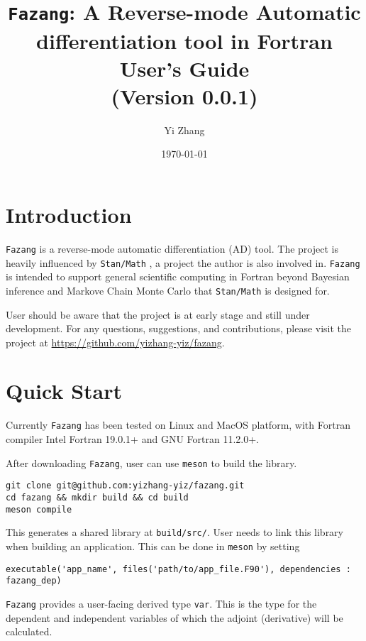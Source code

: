 \documentclass[12pt, reqno, oneside]{amsbook}
\author{Yi Zhang}
\date{\today}
\title{\texttt{Fazang}: A Reverse-mode Automatic differentiation tool in Fortran\\\medskip
\large User's Guide \\  (Version 0.0.1)}
\begin{document}
\maketitle
\tableofcontents


\chapter{Introduction}
\label{sec:orgb2d5569}
\texttt{Fazang} is a reverse-mode automatic differentiation (AD) tool. The
project is heavily influenced by \texttt{Stan/Math} \cite{Carpenter:2015}, a project the author
is also involved in. \texttt{Fazang} is intended to support general scientific
computing in Fortran beyond Bayesian inference and Markove Chain
Monte Carlo that \texttt{Stan/Math} is designed for. 

User should be aware that the project is at early stage and still
under development. For any questions, suggestions, and
contributions, please visit the project at \url{https://github.com/yizhang-yiz/fazang}.
\chapter{Quick Start}
\label{sec:orgf3c265c}
Currently \texttt{Fazang} has been tested on Linux and MacOS platform, with
Fortran compiler Intel Fortran 19.0.1+ and GNU Fortran 11.2.0+.

After downloading \texttt{Fazang}, user can use \texttt{meson} to build the library.
\begin{verbatim}
git clone git@github.com:yizhang-yiz/fazang.git
cd fazang && mkdir build && cd build
meson compile
\end{verbatim}
This generates a shared library at \texttt{build/src/}. User needs to link
this library when building an application. This can be done in
\texttt{meson} by setting
\begin{verbatim}
executable('app_name', files('path/to/app_file.F90'), dependencies : fazang_dep)
\end{verbatim}

\texttt{Fazang} provides a user-facing derived type \texttt{var}. This is the
type for the dependent and independent variables of which the
adjoint (derivative) will be calculated.
\end{document}
